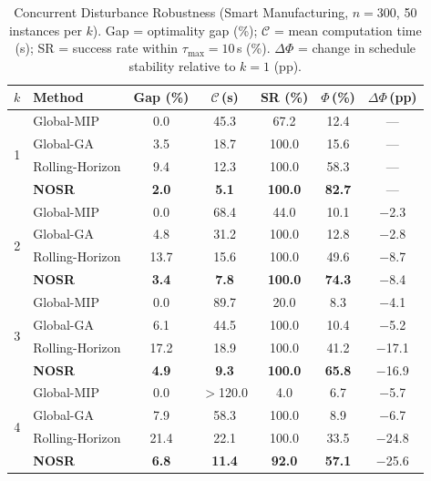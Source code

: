 \documentclass[manuscript,screen,review]{acmart}
\begin{document}
\begin{table}[t]
\centering
\caption{Concurrent Disturbance Robustness (Smart Manufacturing,
$n = 300$, 50 instances per $k$).
Gap = optimality gap (\%); $\mathcal{C}$ = mean computation time (s);
SR = success rate within $\tau_{\max} = 10$\,s (\%).
$\Delta\Phi$ = change in schedule stability relative to $k=1$ (pp).}
\label{tab:concurrent}
\small
\setlength{\tabcolsep}{5pt}
\begin{tabular}{@{}clccccc@{}}
\toprule
\textbf{$k$} & \textbf{Method}
& \textbf{Gap (\%)}
& $\mathcal{C}$\,\textbf{(s)}
& \textbf{SR (\%)}
& $\Phi$\,\textbf{(\%)}
& $\Delta\Phi$\,\textbf{(pp)} \\
\midrule
\multirow{4}{*}{1}
& Global-MIP      & 0.0  & 45.3 & 67.2 & 12.4 & ---  \\
& Global-GA       & 3.5  & 18.7 & 100.0 & 15.6 & ---  \\
& Rolling-Horizon & 9.4  & 12.3 & 100.0 & 58.3 & ---  \\
& \textbf{NOSR}   & \textbf{2.0}  & \textbf{5.1}  & \textbf{100.0} & \textbf{82.7} & ---  \\
\midrule
\multirow{4}{*}{2}
& Global-MIP      & 0.0  & 68.4 & 44.0 & 10.1 & $-$2.3 \\
& Global-GA       & 4.8  & 31.2 & 100.0 & 12.8 & $-$2.8 \\
& Rolling-Horizon & 13.7 & 15.6 & 100.0 & 49.6 & $-$8.7 \\
& \textbf{NOSR}   & \textbf{3.4}  & \textbf{7.8}  & \textbf{100.0} & \textbf{74.3} & $-$8.4 \\
\midrule
\multirow{4}{*}{3}
& Global-MIP      & 0.0  & 89.7 & 20.0 &  8.3 & $-$4.1 \\
& Global-GA       & 6.1  & 44.5 & 100.0 & 10.4 & $-$5.2 \\
& Rolling-Horizon & 17.2 & 18.9 & 100.0 & 41.2 & $-$17.1 \\
& \textbf{NOSR}   & \textbf{4.9}  & \textbf{9.3}  & \textbf{100.0} & \textbf{65.8} & $-$16.9 \\
\midrule
\multirow{4}{*}{4}
& Global-MIP      & 0.0  & $>$120.0 &  4.0 &  6.7 & $-$5.7 \\
& Global-GA       & 7.9  & 58.3 & 100.0 &  8.9 & $-$6.7 \\
& Rolling-Horizon & 21.4 & 22.1 & 100.0 & 33.5 & $-$24.8 \\
& \textbf{NOSR}   & \textbf{6.8}  & \textbf{11.4} & \textbf{92.0} & \textbf{57.1} & $-$25.6 \\
\bottomrule
\end{tabular}
\end{table}
\end{document}
